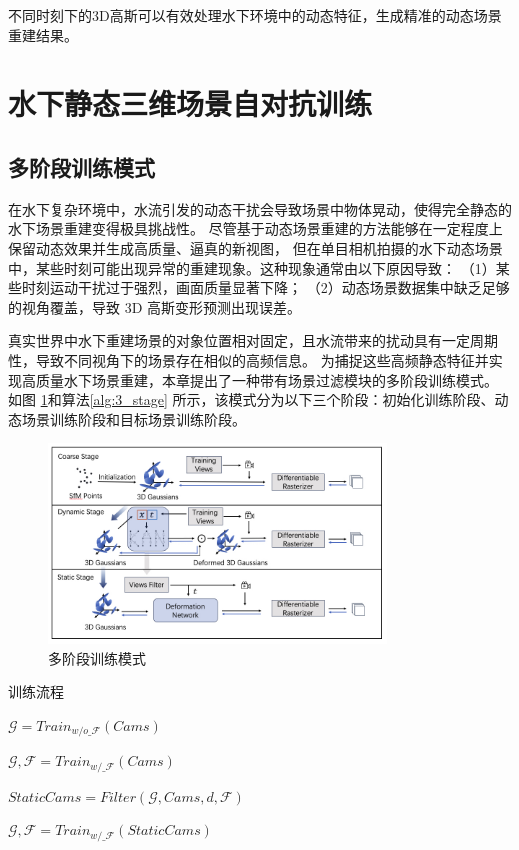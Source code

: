 不同时刻下的3D高斯可以有效处理水下环境中的动态特征，生成精准的动态场景重建结果。

\section{水下静态三维场景自对抗训练}
\subsection{多阶段训练模式}
在水下复杂环境中，水流引发的动态干扰会导致场景中物体晃动，使得完全静态的水下场景重建变得极具挑战性。
尽管基于动态场景重建的方法能够在一定程度上保留动态效果并生成高质量、逼真的新视图，
但在单目相机拍摄的水下动态场景中，某些时刻可能出现异常的重建现象。这种现象通常由以下原因导致：
（1）某些时刻运动干扰过于强烈，画面质量显著下降；
（2）动态场景数据集中缺乏足够的视角覆盖，导致 3D 高斯变形预测出现误差。

真实世界中水下重建场景的对象位置相对固定，且水流带来的扰动具有一定周期性，导致不同视角下的场景存在相似的高频信息。
为捕捉这些高频静态特征并实现高质量水下场景重建，本章提出了一种带有场景过滤模块的多阶段训练模式。
如图 \ref{img:3_stage}和算法\ref{alg:3_stage} 所示，该模式分为以下三个阶段：初始化训练阶段、动态场景训练阶段和目标场景训练阶段。
\begin{figure}[htbp]
    \centering
    \includegraphics[width=0.8\textwidth]{figures/ch4/3_stage.jpg}
    \caption{多阶段训练模式}
    \label{img:3_stage}
\end{figure}

\begin{algorithm}[t]
    \caption{\label{alg:3_stage}训练流程}
    
    $\mathcal{G} = Train_{w/o\_\mathcal{F} }(Cams)$\;

    $\mathcal{G}, \mathcal{F} = Train_{w/\_\mathcal{F} }(Cams)$\;

    $StaticCams = Filter(\mathcal{G}, Cams, d, \mathcal{F})$\;

    $\mathcal{G}, \mathcal{F} = Train_{w/\_\mathcal{F} }(StaticCams)$\;
\end{algorithm}

